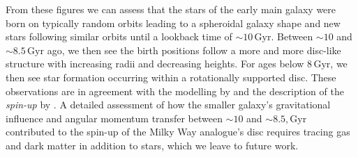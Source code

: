 \documentclass[fleqn,usenatbib]{mnras}
\begin{document}
From these figures we can assess that the stars of the early main galaxy were born on typically random orbits leading to a spheroidal galaxy shape and new stars following similar orbits until a lookback time of $\sim 10\,\mathrm{Gyr}$. Between $\sim10$ and $\sim 8.5\,\mathrm{Gyr}$ ago, we then see the birth positions follow a more and more disc-like structure with increasing radii and decreasing heights. For ages below $8\,\mathrm{Gyr}$, we then see star formation occurring within a rotationally supported disc. These observations are in agreement with the modelling by \citet{MCM2013} and the description of the \textit{spin-up} by \citet{Belokurov2022}. A detailed assessment of how the smaller galaxy’s gravitational influence and angular momentum transfer between $\sim10$ and $\sim8.5,\mathrm{Gyr}$ contributed to the spin-up of the Milky Way analogue’s disc requires tracing gas and dark matter in addition to stars, which we leave to future work.
\end{document}
